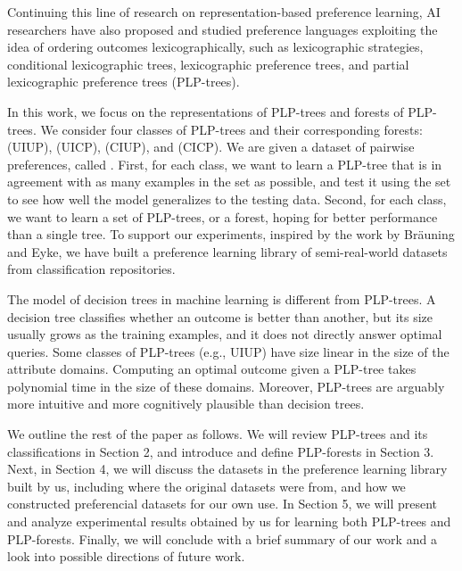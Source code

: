 Continuing this line of research on representation-based
preference learning,
AI researchers have also proposed and studied preference languages 
exploiting the idea of ordering
outcomes lexicographically,
such as lexicographic strategies\cite{schmitt2006complexity},
conditional lexicographic trees\cite{brauning2012learning},
lexicographic preference trees\cite{booth:learningLP}, and
partial lexicographic preference trees (PLP-trees)\cite{conf/aaai15/LiuT}.

In this work, we focus on the representations of PLP-trees and forests of PLP-trees.
We consider four classes of PLP-trees and their corresponding forests:
 (UIUP), 
 (UICP), 
 (CIUP), and
 (CICP).
We are given a dataset of pairwise preferences, called .
First, for each class, we want to learn a PLP-tree that is in agreement
with as many examples in the  set as possible,
and test it using the  set to see how well
the model generalizes to the testing data.
Second, for each class, we want to learn a set of PLP-trees, or a forest,
hoping for better performance than a single tree.
To support our experiments,
inspired by the work by Br{\"a}uning and Eyke\cite{brauning2012learning},
we have built a preference learning library of semi-real-world
datasets from classification repositories.

The model of decision trees
in machine learning is different from PLP-trees.
A decision tree classifies whether an outcome is better than another,
but its size usually grows as the training examples, and it does not
directly answer optimal queries.
Some classes of PLP-trees (e.g., UIUP) have size linear
in the size of the attribute domains.
Computing an optimal outcome given a PLP-tree
takes polynomial time in the size of these domains.
Moreover, PLP-trees are arguably more intuitive and 
more cognitively plausible than decision trees.


We outline the rest of the paper as follows.
We will review PLP-trees and its classifications in Section 2,
and introduce and define PLP-forests in Section 3.
Next, in Section 4, we will discuss the datasets in the 
preference learning library built by us, including where the original 
datasets were from, and how we constructed
preferencial datasets for our own use.
In Section 5, we will present and analyze experimental
results obtained by us for learning both
PLP-trees and PLP-forests.
Finally, we will conclude with a brief summary of our work
and a look into possible directions of future work.


